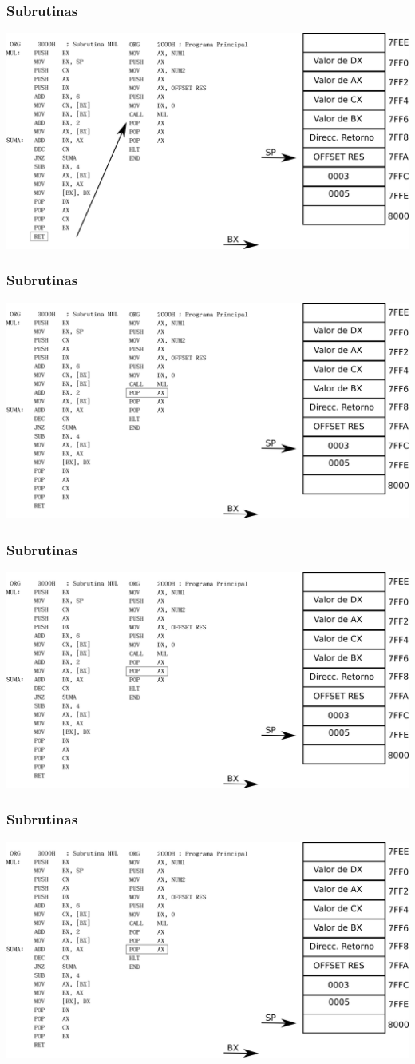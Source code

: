 \documentclass{beamer}
\begin{document}
\begin{frame}
\frametitle{Subrutinas}
\includegraphics[scale=0.70]{imgs/imagen_018.png}
\end{frame}

\begin{frame}
\frametitle{Subrutinas}
\includegraphics[scale=0.70]{imgs/imagen_019.png}
\end{frame}

\begin{frame}
\frametitle{Subrutinas}
\includegraphics[scale=0.70]{imgs/imagen_020.png}
\end{frame}

\begin{frame}
\frametitle{Subrutinas}
\includegraphics[scale=0.70]{imgs/imagen_021.png}
\end{frame}
\end{document}
